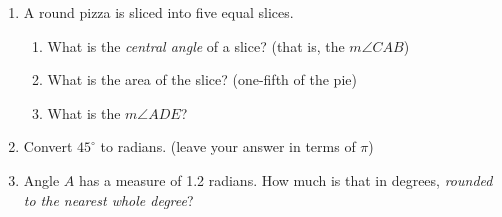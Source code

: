 \documentclass[12pt, twoside]{article}
\begin{document}
\begin{enumerate}
\item A round pizza is sliced into five equal slices.
  \begin{center}
  \end{center}
  \begin{enumerate}
    \item What is the \emph{central angle} of a slice? (that is, the $m\angle CAB$) \vspace{2cm}
    \item What is the area of the slice? (one-fifth of the pie) \vspace{3cm}
    \item What is the $m\angle ADE$? \vspace{3cm}
  \end{enumerate}

\item Convert $45^\circ$ to radians. (leave your answer in terms of $\pi$) \vspace{1.5cm}

\item Angle $A$ has a measure of 1.2 radians. How much is that in degrees, \emph{rounded to the nearest whole degree}?

\end{enumerate}
\end{document}
